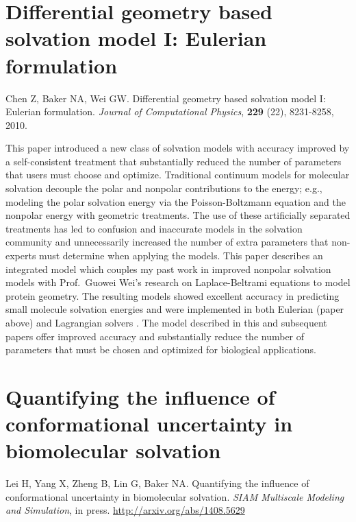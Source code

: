 \documentclass[11pt]{amsart}
\begin{document}
\section{Differential geometry based solvation model I: Eulerian formulation}

\noindent\makebox[\linewidth]{\rule{\linewidth}{0.4pt}}
Chen Z, Baker NA, Wei GW.  Differential geometry based solvation model I: Eulerian formulation.  \textit{Journal of Computational Physics}, \textbf{229} (22), 8231-8258, 2010. \\
\noindent\makebox[\linewidth]{\rule{\linewidth}{0.4pt}}

This paper introduced a new class of solvation models with accuracy improved by a self-consistent treatment that substantially reduced the number of parameters that users must choose and optimize.
Traditional continuum models for molecular solvation decouple the polar and nonpolar contributions to the energy; e.g., modeling the polar solvation energy via the Poisson-Boltzmann equation and the nonpolar energy with geometric treatments.  
The use of these artificially separated treatments has led to confusion and inaccurate models in the solvation community and unnecessarily increased the number of extra parameters that non-experts must determine when applying the models.
This paper describes an integrated model which couples my past work in improved nonpolar solvation models \cite{wagoner2006assessing} with Prof.~Guowei Wei's research on Laplace-Beltrami equations to model protein geometry.
The resulting models showed excellent accuracy in predicting small molecule solvation energies \cite{chen2012variational,daily2013origin,thomas2013parameterization} and were implemented in both Eulerian (paper above) and Lagrangian solvers \cite{chen2011differential}.
The model described in this and subsequent papers offer improved accuracy and substantially reduce the number of parameters that must be chosen and optimized for biological applications.

\section{Quantifying the influence of conformational uncertainty in biomolecular solvation}

\noindent\makebox[\linewidth]{\rule{\linewidth}{0.4pt}}
Lei H, Yang X, Zheng B, Lin G, Baker NA.  Quantifying the influence of conformational uncertainty in biomolecular solvation. \textit{SIAM Multiscale Modeling and Simulation}, in press.  \url{http://arxiv.org/abs/1408.5629} \\
\noindent\makebox[\linewidth]{\rule{\linewidth}{0.4pt}}
\end{document}
